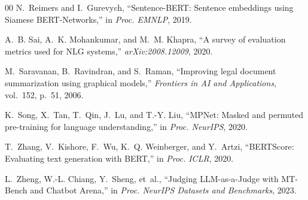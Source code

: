 \documentclass[conference,a4paper]{IEEEtran}
\begin{document}
\begin{thebibliography}{00}
N.~Reimers and I.~Gurevych, ``Sentence-BERT: Sentence embeddings using Siamese BERT-Networks,'' in \textit{Proc. EMNLP}, 2019.

A.~B. Sai, A.~K. Mohankumar, and M.~M. Khapra, ``A survey of evaluation metrics used for NLG systems,'' \textit{arXiv:2008.12009}, 2020.

M.~Saravanan, B.~Ravindran, and S.~Raman, ``Improving legal document summarization using graphical models,'' \textit{Frontiers in AI and Applications}, vol.~152, p.~51, 2006.

K.~Song, X.~Tan, T.~Qin, J.~Lu, and T.-Y. Liu, ``MPNet: Masked and permuted pre-training for language understanding,'' in \textit{Proc. NeurIPS}, 2020.

T.~Zhang, V.~Kishore, F.~Wu, K.~Q. Weinberger, and Y.~Artzi, ``BERTScore: Evaluating text generation with BERT,'' in \textit{Proc. ICLR}, 2020.

L.~Zheng, W.-L. Chiang, Y.~Sheng, et~al., ``Judging LLM-as-a-Judge with MT-Bench and Chatbot Arena,'' in \textit{Proc. NeurIPS Datasets and Benchmarks}, 2023.

\end{thebibliography}
\end{document}
